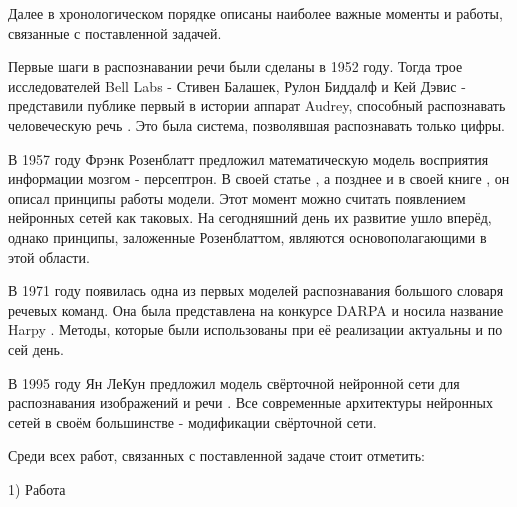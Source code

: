 Далее в хронологическом порядке описаны наиболее важные моменты и работы, связанные с поставленной задачей.

Первые шаги в распознавании речи были сделаны в 1952 году. Тогда трое исследователей Bell Labs - Стивен Балашек, Рулон Биддалф и Кей Дэвис - представили публике первый в истории аппарат Audrey, способный распознавать человеческую речь \cite{Audrey}. Это была система, позволявшая распознавать только цифры. 

В 1957 году Фрэнк Розенблатт предложил математическую модель восприятия информации мозгом - персептрон. В своей статье \cite{PerceptronArticle}, а позднее и в своей книге \cite{PerceptronBook}, он описал принципы работы модели. Этот момент можно считать появлением нейронных сетей как таковых. На сегодняшний день их развитие ушло вперёд, однако принципы, заложенные Розенблаттом, являются основополагающими в этой области.

В 1971 году появилась одна из первых моделей распознавания большого словаря речевых команд. Она была представлена на конкурсе DARPA и носила название Harpy \cite{Harpy}. Методы, которые были использованы при её реализации актуальны и по сей день.

В 1995 году Ян ЛеКун предложил модель свёрточной нейронной сети для распознавания изображений и речи \cite{CNN}. Все современные архитектуры нейронных сетей в своём большинстве - модификации свёрточной сети.


Среди всех работ, связанных с поставленной задаче стоит отметить:

1) Работа 